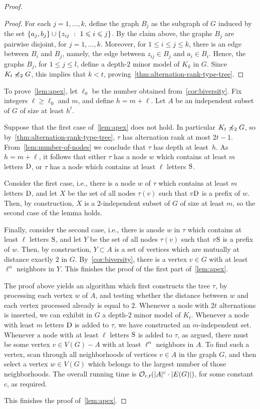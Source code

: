\begin{proof}
\begin{proof}
For each $j=1,\ldots,k$, define the graph $B_j$
as the subgraph of $G$ induced by the set
$\{a_j,b_j\}\cup\{z_{ij}~:~ 1\leqslant i\leqslant  j\}$.
By the claim above, the graphs $B_j$
are pairwise disjoint, for $j=1,\ldots,k$.
Moreover, for $1\le i\le j\le k$, there is an edge between $B_i$
and $B_j$, namely, the edge between $z_{ij}\in B_j$
and $a_i\in B_i$.
Hence, the graphs $B_j$, for $1\le j\le l$, define a depth-$2$ minor model of $K_k$ in $G$. Since $K_t\not\preccurlyeq_{2}G$, this implies that $k<t$, proving~\cref{thm:alternation-rank-type-tree}.
\end{proof}

To prove~\cref{lem:apex}, let $\ell_0$
be the number obtained from~\cref{cor:biversity}.
Fix integers $\ell\ge \ell_0$ and $m$, and define $h=m+\ell$.
Let $A$ be an independent subset of $G$
of size at least $h^{t}$.

Suppose that the first case of~\cref{lem:apex} does not hold. In particular $K_t\not\preccurlyeq_2 G$, so by~\cref{thm:alternation-rank-type-tree}, $\tau$ has alternation rank at most $2t-1$. From~\cref{lem:number-of-nodes} 
we conclude that $\tau$  has depth at least~$h$.
As $h=m+\ell$, it follows that either $\tau$  has a node $w$ which contains at least $m$ letters $\mathrm{D}$, or $\tau$ has a node which contains  at least $\ell$ letters $\mathrm{S}$.

Consider the first case, i.e., there is a node $w$ of $\tau$
which contains at least $m$ letters $\mathrm{D}$, and let $X$
be the set of all nodes $\tau(v)$ such that $v\mathrm{D}$ is a prefix of $w$. Then, by construction, $X$ is a $2$-independent subset of $G$ of size at least $m$, so the second case of the lemma holds.

Finally, consider the second case, i.e., there is anode $w$ in $\tau$ which contains at least $\ell$ letters $\mathrm{S}$, and let 
$Y$ be the set of all nodes $\tau(v)$ such that $v\mathrm{S}$ is a prefix of $w$. Then, by construction, $Y\subset A$ is a set of vertices which are mutually at distance exactly $2$ in $G$. By~\cref{cor:biversity}, there is a vertex $v\in G$
with at least $\ell^{\alpha}$ neighbors in $Y$.
This finishes the proof of the first part of~\cref{lem:apex}.

\medskip
The proof above yields an algorithm which first constructs the tree $\tau$, by 
processing each vertex $w$ of $A$, and testing whether the distance between $w$ and each vertex processed already is equal to $2$. Whenever a node with $2t$ alternations 
is inserted, we can exhibit in $G$ a depth-$2$ minor model of $K_t$.
Whenever a node with least $m$ letters $\mathrm{D}$ is added to $\tau$,
we have constructed an $m$-independent set. Whenever a node with at least $\ell$ letters $\mathrm{S}$ is added to $\tau$, as argued, there must be some vertex $v\in V(G)-A$ with at least $\ell^\alpha$ neighbors in $A$. To find such a vertex, scan through all neighborhoods of vertices $v\in A$ in the graph $G$, and then select a vertex $w\in V(G)$
which belongs to the largest number of those neighborhoods. The overall running time is 
$\mathcal{O}_{r,t}(|A|^c\cdot |E(G)|)$, for some constant $c$, as required.

\medskip
This finishes the proof of~\cref{lem:apex}.
\end{proof}

